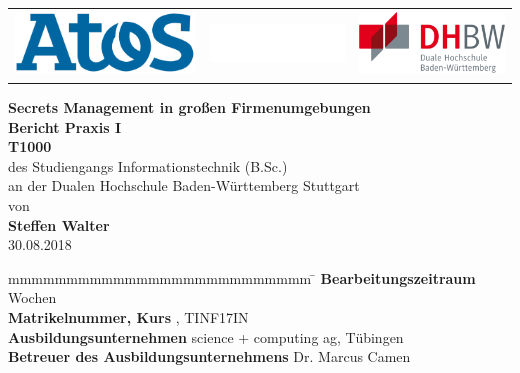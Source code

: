 \documentclass[
a4paper,   
titlepage,  
halfparskip,
12pt        
]{scrartcl}
\begin{document}

\begin{titlepage}
\begin{longtable}{lcr}
{\includegraphics[height=1.7cm]{logo}} &
{\includegraphics[height=1.05cm]{blank}} &
{\includegraphics[height=1.7cm]{dhbw}}
\end{longtable}
\bigskip
\bigskip
\begin{center}
\vspace*{12mm} {\LARGE\bf Secrets Management in großen Firmenumgebungen}\\
\vspace*{12mm} {\large\bf Bericht Praxis I}\\
\vspace*{3mm} {\large\bf T1000}\\
\vspace*{12mm} des Studiengangs Informationstechnik (B.Sc.)\\ an der Dualen Hochschule Baden-Württemberg Stuttgart\\
\vspace*{12mm} von\\
\vspace*{3mm} {\large\bf Steffen Walter}\\
\vspace*{12mm} 30.08.2018\\
\end{center}
\vfill
\begin{spacing}{1.5}
\begin{tabbing}
mmmmmmmmmmmmmmmmmmmmmmmmmm \= \kill
\textbf{Bearbeitungszeitraum}  Wochen\\
\textbf{Matrikelnummer, Kurs} , TINF17IN\\
\textbf{Ausbildungsunternehmen} \> science + computing ag, Tübingen\\
\textbf{Betreuer des Ausbildungsunternehmens} \>Dr. Marcus Camen\\
\end{tabbing}
\end{spacing}
\end{titlepage}
\end{document}
